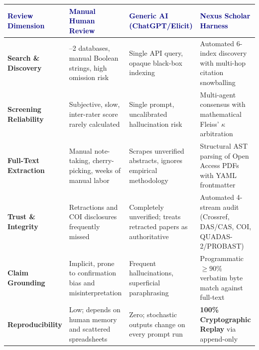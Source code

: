 \documentclass[10pt,a4paper]{article}
\newcommand{\codebadge}[1]{%
  \tcbox[on line, boxsep=0pt, left=3pt, right=3pt, top=1.5pt, bottom=1.5pt,
         colframe=Slate!40, colback=LightSlate, coltext=Navy, arc=2pt,
         boxrule=0.5pt, fontupper=\ttfamily\scriptsize]{#1}%
}
\begin{document}
\vspace{4pt}
\begin{center}
\small
\renewcommand{\arraystretch}{1.25}
\begin{tabularx}{\textwidth}{@{} l >{\raggedright\arraybackslash}X >{\raggedright\arraybackslash}X >{\raggedright\arraybackslash}X @{}}
\toprule
\textbf{\textcolor{Navy}{Review Dimension}} & \textbf{\textcolor{Navy}{Manual Human Review}} & \textbf{\textcolor{Navy}{Generic AI (ChatGPT/Elicit)}} & \textbf{\textcolor{Navy}{Nexus Scholar Harness}} \\
\midrule
\textbf{Search \& Discovery} & 1--2 databases, manual Boolean strings, high omission risk & Single API query, opaque black-box indexing & Automated 6-index discovery with multi-hop citation snowballing \\

\textbf{Screening Reliability} & Subjective, slow, inter-rater score rarely calculated & Single prompt, uncalibrated hallucination risk & Multi-agent consensus with mathematical Fleiss' $\kappa$ arbitration \\

\textbf{Full-Text Extraction} & Manual note-taking, cherry-picking, weeks of manual labor & Scrapes unverified abstracts, ignores empirical methodology & Structural AST parsing of Open Access PDFs with YAML frontmatter \\

\textbf{Trust \& Integrity} & Retractions and COI disclosures frequently missed & Completely unverified; treats retracted papers as authoritative & Automated 4-stream audit (Crossref, DAS/CAS, COI, QUADAS-2/PROBAST) \\

\textbf{Claim Grounding} & Implicit, prone to confirmation bias and misinterpretation & Frequent hallucinations, superficial paraphrasing & Programmatic $\ge 90\%$ verbatim byte match against full-text \\

\textbf{Reproducibility} & Low; depends on human memory and scattered spreadsheets & Zero; stochastic outputs change on every prompt run & \textbf{100\% Cryptographic Replay} via append-only \codebadge{audit/journal.jsonl} \\
\bottomrule
\end{tabularx}
\end{center}

\vspace{6pt}

\end{document}
